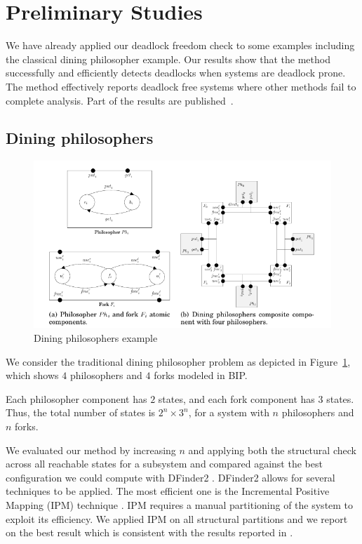 \section{Preliminary Studies}

We have already applied our deadlock freedom check to some 
examples including the classical dining philosopher 
example.
%
Our results show that the method successfully 
and efficiently detects deadlocks when systems are 
deadlock prone.
The method effectively reports deadlock free systems 
where other methods fail to complete analysis. 
Part of the results are published~\cite{FORTE13}. 

\subsection{Dining philosophers}

\begin{figure}
  \includegraphics[width=1.1\textwidth]{fig/dining2}
  \caption{Dining philosophers example}\label{fig:dining}
\end{figure}

We consider the traditional dining philosopher problem as depicted in 
Figure~\ref{fig:dining}, which shows $4$ philosophers and $4$ forks modeled in BIP. 

Each philosopher component has $2$ states, and each fork component has $3$ states. 
Thus, the total number of states is $2^n \times 3^n$, for a system
with $n$ philosophers and $n$ forks.

We evaluated our method by increasing $n$ and applying both 
the structural check across all reachable states for a
subsystem and compared against the best configuration 
we could compute with DFinder2 \cite{DFinder2}.
DFinder2 allows for several techniques to be applied. 
The most efficient one is 
the Incremental Positive Mapping (IPM) technique \cite{DFinder2}. 
IPM requires a manual partitioning of the system to exploit its efficiency. 
We applied IPM on all structural partitions and we report on the best result which is consistent 
with the results reported in \cite{DFinder2}. 

